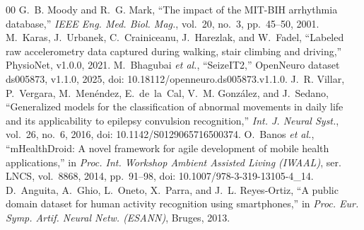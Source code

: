 \documentclass[conference]{IEEEtran}
\begin{document}
\begin{thebibliography}{00}
 G.~B. Moody and R.~G. Mark, ``The impact of the MIT-BIH arrhythmia database,'' \emph{IEEE Eng. Med. Biol. Mag.}, vol.~20, no.~3, pp.~45--50, 2001.
 M.~Karas, J.~Urbanek, C.~Crainiceanu, J.~Harezlak, and W.~Fadel, ``Labeled raw accelerometry data captured during walking, stair climbing and driving,'' PhysioNet, v1.0.0, 2021.
 M.~Bhagubai \emph{et al.}, ``SeizeIT2,'' OpenNeuro dataset ds005873, v1.1.0, 2025, doi: 10.18112/openneuro.ds005873.v1.1.0.
 J.~R. Villar, P.~Vergara, M.~Men\'endez, E.~de~la~Cal, V.~M. Gonz\'alez, and J.~Sedano, ``Generalized models for the classification of abnormal movements in daily life and its applicability to epilepsy convulsion recognition,'' \emph{Int. J. Neural Syst.}, vol.~26, no.~6, 2016, doi: 10.1142/S0129065716500374.
 O.~Banos \emph{et al.}, ``mHealthDroid: A novel framework for agile development of mobile health applications,'' in \emph{Proc. Int. Workshop Ambient Assisted Living (IWAAL)}, ser. LNCS, vol.~8868, 2014, pp.~91--98, doi: 10.1007/978-3-319-13105-4\_14.
 D.~Anguita, A.~Ghio, L.~Oneto, X.~Parra, and J.~L. Reyes-Ortiz, ``A public domain dataset for human activity recognition using smartphones,'' in \emph{Proc. Eur. Symp. Artif. Neural Netw. (ESANN)}, Bruges, 2013.
\end{thebibliography}
\end{document}
